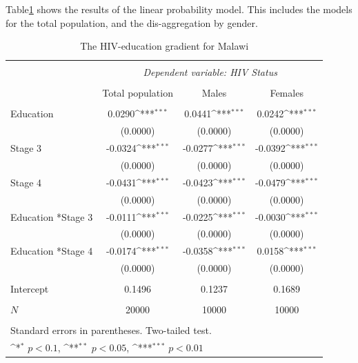   Table\ref{gradient} shows the results of the linear probability model. This includes the models for the total population, and the dis-aggregation by gender. 
\begin{table}[H]
\centering
  \caption{The HIV-education gradient for Malawi} 
  \label{gradient} 
{
\def\sym#1{\ifmmode^{#1}\else\(^{#1}\)\fi}
\begin{tabular}{l c c c}
\hline\hline\\[-1.8ex] 
 & \multicolumn{3}{c}{\textit{Dependent variable: HIV Status}} \\ 
\cline{2-4}\\[-1.8ex]  
            &\multicolumn{1}{c}{Total population}&\multicolumn{1}{c}{Males}&\multicolumn{1}{c}{Females}\\
\hline\\[-1.8ex] 
Education      &      0.0290\sym{***}&      0.0441\sym{***}&     0.0242\sym{***}  \\
            &    (0.0000)         &    (0.0000)         &     (0.0000)   \\
[0.25em]
Stage 3     &     -0.0324\sym{***}&     -0.0277\sym{***}  &   -0.0392\sym{***} \\
            &    (0.0000)         &    (0.0000)         &     (0.0000)   \\
[0.25em]
Stage 4 &     -0.0431\sym{***}     &     -0.0423\sym{***}       &       -0.0479\sym{***}\\
    &    (0.0000)         &    (0.0000)         &     (0.0000) \\
[0.25em]
Education *Stage 3    &      -0.0111\sym{***}&      -0.0225\sym{***} &      -0.0030\sym{***} \\
            &    (0.0000)         &    (0.0000)         &     (0.0000)  \\
            [0.25em]
Education *Stage 4 &     -0.0174\sym{***}&     -0.0358\sym{***}&      0.0158\sym{***} \\
            &    (0.0000)         &    (0.0000)         &     (0.0000)  \\
[0.25em]
            
\hline\\[-1.8ex] 
            
Intercept      &      0.1496&      0.1237&      0.1689\\
            
\hline\\[-1.8ex] 

\(N\)       &        20000         &        10000 &        10000   \\
\hline\hline\\[-1.8ex] 
\multicolumn{4}{l}{\footnotesize Standard errors in parentheses. Two-tailed test.}\\
\multicolumn{4}{l}{\footnotesize \sym{*} \(p<0.1\), \sym{**} \(p<0.05\), \sym{***} \(p<0.01\)}\\
\end{tabular}
}
\end{table}

